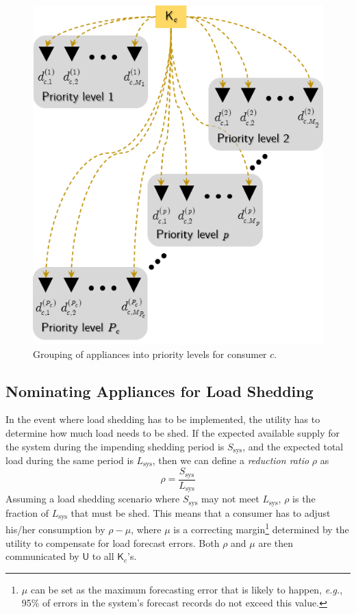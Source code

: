 \documentclass[conference, a4paper]{IEEEtran}
\begin{document}
\begin{figure}[t!]
	\centering
	\includegraphics[scale=0.75]{figure-IV-02.png}
	\caption{Grouping of appliances into priority levels for consumer $c$.}
	\label{figIV-02}
\end{figure}

\subsection{Nominating Appliances for Load Shedding}
\label{subsec: II--Nominating Appliances for Load Shedding}

In the event where load shedding has to be implemented, the utility has to determine how much load needs to be shed.
If the expected available supply for the system during the impending shedding period is $S_{\text{sys}}$,
and the expected total load during the same period is $L_{\text{sys}}$,
then we can define a \textit{reduction ratio} $\rho$ as
\begin{equation}
	\rho = \frac{S_{\text{sys}}}{L_{\text{sys}}}
	\label{eqn29}
\end{equation}
Assuming a load shedding scenario where $S_{\text{sys}}$ may not meet $L_{\text{sys}}$,
$\rho$ is the fraction of $L_{\text{sys}}$ that must be shed.
This means that a consumer has to adjust his/her consumption by $\rho - \mu$,
where $\mu$ is a correcting margin\footnote{
$\mu$ can be set as the maximum forecasting error that is likely to happen,
\textit{e.g.}, 95\% of errors in the system's forecast records do not exceed this value.}
determined by the utility to compensate for load forecast errors.
Both $\rho$ and $\mu$ are then communicated by $\mathsf{U}$ to all $\mathsf{K}_{c}$'s.
\end{document}
